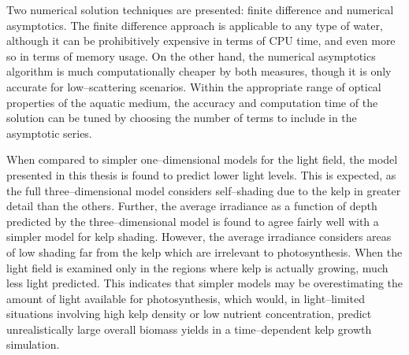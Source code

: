 \documentclass[ms,cpyr,lof,lot]{uathesis}
\begin{document}
Two numerical solution techniques are presented: finite difference and numerical asymptotics.
The finite difference approach is applicable to any type of water, although it can be prohibitively expensive in terms of CPU time, and even more so in terms of memory usage.
On the other hand, the numerical asymptotics algorithm is much computationally cheaper by both measures, though it is only accurate for low--scattering scenarios.
Within the appropriate range of optical properties of the aquatic medium, the accuracy and computation time of the solution can be tuned by choosing the number of terms to include in the asymptotic series.

When compared to simpler one--dimensional models for the light field, the model presented in this thesis is found to predict lower light levels.
This is expected, as the full three--dimensional model considers self--shading due to the kelp in greater detail than the others.
Further, the average irradiance as a function of depth predicted by the three--dimensional model is found to agree fairly well with a simpler model for kelp shading.
However, the average irradiance considers areas of low shading far from the kelp which are irrelevant to photosynthesis.
When the light field is examined only in the regions where kelp is actually growing, much less light predicted.
This indicates that simpler models may be overestimating the amount of light available for photosynthesis, which would, in light--limited situations involving high kelp density or low nutrient concentration, predict unrealistically large overall biomass yields in a time--dependent kelp growth simulation.
\end{document}
